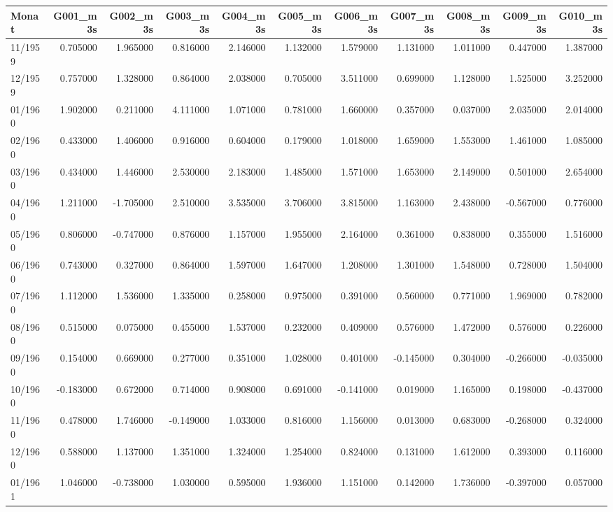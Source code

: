 \begin{tabular}{lrrrrrrrrrr}
\toprule
Monat & G001_m3s & G002_m3s & G003_m3s & G004_m3s & G005_m3s & G006_m3s & G007_m3s & G008_m3s & G009_m3s & G010_m3s \\
\midrule
11/1959 & 0.705000 & 1.965000 & 0.816000 & 2.146000 & 1.132000 & 1.579000 & 1.131000 & 1.011000 & 0.447000 & 1.387000 \\
12/1959 & 0.757000 & 1.328000 & 0.864000 & 2.038000 & 0.705000 & 3.511000 & 0.699000 & 1.128000 & 1.525000 & 3.252000 \\
01/1960 & 1.902000 & 0.211000 & 4.111000 & 1.071000 & 0.781000 & 1.660000 & 0.357000 & 0.037000 & 2.035000 & 2.014000 \\
02/1960 & 0.433000 & 1.406000 & 0.916000 & 0.604000 & 0.179000 & 1.018000 & 1.659000 & 1.553000 & 1.461000 & 1.085000 \\
03/1960 & 0.434000 & 1.446000 & 2.530000 & 2.183000 & 1.485000 & 1.571000 & 1.653000 & 2.149000 & 0.501000 & 2.654000 \\
04/1960 & 1.211000 & -1.705000 & 2.510000 & 3.535000 & 3.706000 & 3.815000 & 1.163000 & 2.438000 & -0.567000 & 0.776000 \\
05/1960 & 0.806000 & -0.747000 & 0.876000 & 1.157000 & 1.955000 & 2.164000 & 0.361000 & 0.838000 & 0.355000 & 1.516000 \\
06/1960 & 0.743000 & 0.327000 & 0.864000 & 1.597000 & 1.647000 & 1.208000 & 1.301000 & 1.548000 & 0.728000 & 1.504000 \\
07/1960 & 1.112000 & 1.536000 & 1.335000 & 0.258000 & 0.975000 & 0.391000 & 0.560000 & 0.771000 & 1.969000 & 0.782000 \\
08/1960 & 0.515000 & 0.075000 & 0.455000 & 1.537000 & 0.232000 & 0.409000 & 0.576000 & 1.472000 & 0.576000 & 0.226000 \\
09/1960 & 0.154000 & 0.669000 & 0.277000 & 0.351000 & 1.028000 & 0.401000 & -0.145000 & 0.304000 & -0.266000 & -0.035000 \\
10/1960 & -0.183000 & 0.672000 & 0.714000 & 0.908000 & 0.691000 & -0.141000 & 0.019000 & 1.165000 & 0.198000 & -0.437000 \\
11/1960 & 0.478000 & 1.746000 & -0.149000 & 1.033000 & 0.816000 & 1.156000 & 0.013000 & 0.683000 & -0.268000 & 0.324000 \\
12/1960 & 0.588000 & 1.137000 & 1.351000 & 1.324000 & 1.254000 & 0.824000 & 0.131000 & 1.612000 & 0.393000 & 0.116000 \\
01/1961 & 1.046000 & -0.738000 & 1.030000 & 0.595000 & 1.936000 & 1.151000 & 0.142000 & 1.736000 & -0.397000 & 0.057000 \\

\end{tabular}
